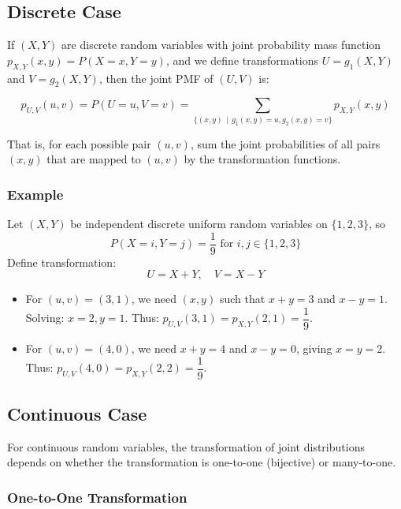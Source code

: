 \documentclass[twoside]{book}
\begin{document}
\subsection{Discrete Case}

If $(X,Y)$ are discrete random variables with joint probability mass function $p_{X,Y}(x,y) = P(X=x, Y=y)$, and we define transformations $U = g_1(X,Y)$ and $V = g_2(X,Y)$, then the joint PMF of $(U,V)$ is:
\begin{textbox}
\[
p_{U,V}(u,v) = P(U = u, V = v) = \sum_{\{(x,y) \,\mid \, g_1(x,y) = u, g_2(x,y) = v\}} p_{X,Y}(x,y)
\]
\end{textbox}

That is, for each possible pair $(u,v)$, sum the joint probabilities of all pairs $(x,y)$ that are mapped to $(u,v)$ by the transformation functions.


\subsubsection{Example}

Let $(X,Y)$ be independent discrete uniform random variables on $\{1,2,3\}$, so $$P(X=i, Y=j) = \dfrac{1}{9} \text{ for } i,j \in \{1,2,3\}$$
Define transformation: $$ U = X + Y, \quad V = X - Y $$

\begin{itemize}
\item For $(u,v) = (3,1)$, we need $(x,y)$ such that $x + y = 3$ and $x - y = 1$. Solving: $x = 2, y = 1$.
Thus: $p_{U,V}(3,1) = p_{X,Y}(2,1) = \dfrac{1}{9}$.

\item For $(u,v) = (4,0)$, we need $x + y = 4$ and $x - y = 0$, giving $x = y = 2$.
Thus: $p_{U,V}(4,0) = p_{X,Y}(2,2) = \dfrac{1}{9}$.
\end{itemize}

\subsection{Continuous Case}

For continuous random variables, the transformation of joint distributions depends on whether the transformation is one-to-one (bijective) or many-to-one.

\subsubsection*{One-to-One Transformation}
\end{document}
